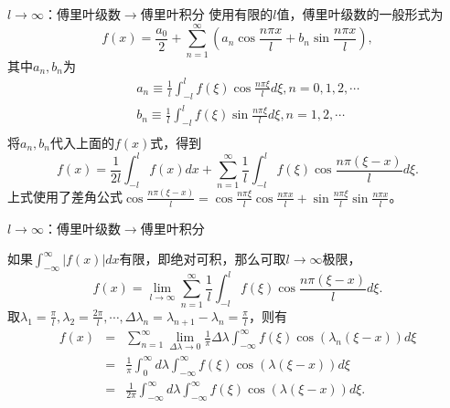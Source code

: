 \documentclass[11pt]{beamer}
\begin{document}
\begin{frame}{$l \rightarrow \infty$：傅里叶级数$\rightarrow$傅里叶积分}
使用有限的$l$值，傅里叶级数的一般形式为
\begin{equation}
f(x) = \frac{a_0}{2} + \sum^\infty_{n=1} ( a_n \cos \frac{n\pi x}{l} + b_n \sin \frac{n\pi x}{l} ),
\end{equation}
其中$a_n, b_n$为
\begin{eqnarray}
&& a_n \equiv \frac{1}{l} \int^l_{-l} f(\xi) \cos \frac{n \pi \xi}{l} d \xi, n=0,1,2,\cdots \\
&& b_n \equiv \frac{1}{l} \int^l_{-l} f(\xi) \sin \frac{n \pi \xi}{l} d \xi, n=1,2,\cdots \\
\end{eqnarray}
将$a_n, b_n$代入上面的$f(x)$式，得到
\begin{equation}
f(x) = \frac{1}{2l} \int^l_{-l} f(x) dx + \sum^\infty_{n=1} \frac{1}{l}\int^l_{-l} f(\xi) \cos \frac{n\pi(\xi - x)}{l} d \xi.
\end{equation}
上式使用了差角公式$\cos \frac{n\pi(\xi - x)}{l} = \cos \frac{n\pi\xi}{l} \cos \frac{n\pi x}{l} + \sin \frac{n\pi\xi }{l} \sin \frac{n\pi x}{l}$。
\end{frame}

\begin{frame}{$l \rightarrow \infty$：傅里叶级数$\rightarrow$傅里叶积分}

如果$\int^\infty_{-\infty} |f(x)| dx$有限，即绝对可积，那么可取$l \rightarrow \infty$极限，
\begin{equation}
f(x) = \lim\limits_{l \rightarrow \infty} \sum^\infty_{n=1} \frac{1}{l} \int^l_{-l} f(\xi) \cos \frac{n \pi (\xi - x)}{l} d \xi.
\end{equation}
取$\lambda_1 = \frac{\pi}{l}, \lambda_2 = \frac{2\pi}{l}, \cdots, \Delta \lambda_n = \lambda_{n+1} - \lambda_n = \frac{\pi}{l}$，则有
\begin{eqnarray}
f(x) &=& \sum\limits^\infty_{n=1}\lim\limits_{\Delta \lambda \rightarrow 0} \frac{1}{\pi} \Delta \lambda \int^\infty_{-\infty} f(\xi) \cos( \lambda_n (\xi - x) ) d \xi \nonumber \\
&=& \frac{1}{\pi} \int^\infty_0 d \lambda \int^\infty_{-\infty} f(\xi) \cos(\lambda (\xi - x)) d \xi \nonumber \\
&=& \frac{1}{2\pi} \int^\infty_{-\infty} d \lambda \int^\infty_{-\infty} f(\xi) \cos(\lambda (\xi - x)) d \xi .
\end{eqnarray}

\end{frame}
\end{document}
